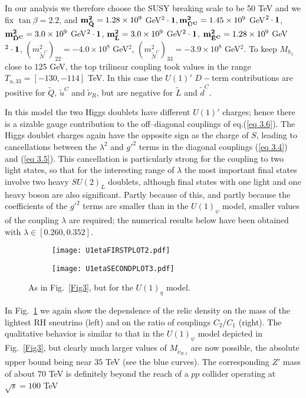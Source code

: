 \documentclass[a4paper,11pt]{article}
\begin{document}
In our analysis we therefore choose the SUSY breaking scale to be 50
TeV and we fix $\tan\beta = 2.2$, and
${\bf m^2_{\tilde Q}} = 1.28 \times 10^9$
GeV$^{2} \cdot{\bf 1}, {\bf m^2_{\tilde U^C}} = 1.45 \times 10^9$
GeV$^{2} \cdot{\bf 1}$, ${\bf m^2_{\tilde D^C}} = 3.0 \times 10^9$
GeV$^{2} \cdot {\bf 1}$, ${\bf m^2_{\tilde L}} = 3.0 \times 10^9$
GeV$^{2} \cdot{\bf 1}$, ${\bf m^2_{\tilde E^C}} = 1.28 \times 10^9$
GeV$^{2} \cdot {\bf 1}$,
$\left(m^2_{\tilde N^C}\right)_{22} = -4.0 \times 10^8$ GeV$^2$,
$\left(m^2_{\tilde N^C}\right)_{33} = -3.9 \times 10^8$ GeV$^2$. To
keep $M_{h_{1}}$ close to 125 GeV, the top trilinear coupling took
values in the range ${T_{u,33}}= [-130, -114]$ TeV.  In this case the
$U(1)'$ $D-$term contributions are positive for
$\tilde Q, \, \tilde u^C$ and $\tilde \nu_R$, but are negative for
$\tilde L$ and $\tilde d^C$.

In this model the two Higgs doublets have different $U(1)'$ charges;
hence there is a sizable gauge contribution to the off--diagonal
couplings of eq.(\ref{eq 3.6}). The Higgs doublet charges again have
the opposite sign as the charge of $S$, leading to cancellations
between the $\lambda^2$ and $g'^2$ terms in the diagonal couplings
(\ref{eq 3.4}) and (\ref{eq 3.5}). This cancellation is particularly
strong for the coupling to two light states, so that for the
interesting range of $\lambda$ the most important final states involve
two heavy $SU(2)_{L}$ doublets, although final states with one light and
one heavy boson are also significant. Partly because of this, and partly
because the coefficients of the $g'^2$ terms are smaller than in the
$U(1)_\psi$ model, smaller values of the coupling $\lambda$ are
required; the numerical results below have been obtained with
$\lambda \in [0.260, 0.352]$.
  
\begin{figure}[h!]
\begin{subfigure}[b]{0.5\linewidth}
\centering\texttt{[image: U1etaFIRSTPLOT2.pdf]}
\caption{}
\end{subfigure}\hfill
\begin{subfigure}[b]{0.55\linewidth}
\centering\texttt{[image: U1etaSECONDPLOT3.pdf]}
\caption{}
\end{subfigure}   
\caption{As in Fig.~\ref{Fig3}, but for the $U(1)_\eta$ model. \label{Fig4}}
\end{figure}

In Fig.~\ref{Fig4} we again show the dependence of the relic density on
the mass of the lightest RH sneutrino (left) and on the ratio of couplings
$C_2/C_1$ (right). The qualitative behavior is similar to that in
the $U(1)_\psi$ model depicted in Fig.~\ref{Fig3}, but clearly much larger
values of $M_{\tilde \nu_{R,1}}$ are now possible, the absolute upper bound
being near $35$ TeV (see the blue curves). The corresponding $Z'$ mass
of about $70$ TeV is definitely beyond the reach of a $pp$ collider 
operating at $\sqrt{s} = 100$ TeV
\end{document}
